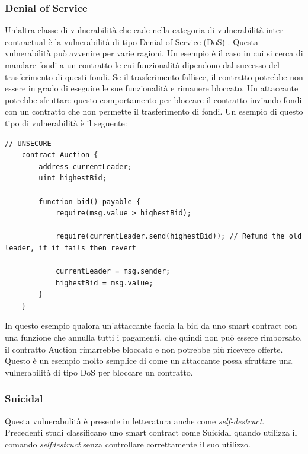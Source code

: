\documentclass[../../Thesis.tex]{subfiles}
\begin{document}
\subsubsection{Denial of Service}
Un'altra classe di vulnerabilità che cade nella categoria di vulnerabilità inter-contractual è la vulnerabilità di tipo Denial of Service (DoS) \cite{sc-vulnerabilities}. Questa vulnerabilità può avvenire per varie ragioni.
Un esempio è il caso in cui si cerca di mandare fondi a un contratto le cui funzionalità dipendono dal successo del trasferimento di questi fondi. Se il trasferimento fallisce, il contratto potrebbe non essere in grado di eseguire le sue funzionalità e rimanere bloccato. Un attaccante potrebbe sfruttare questo comportamento per bloccare il contratto inviando fondi con un contratto che non permette il trasferimento di fondi. Un esempio di questo tipo di vulnerabilità è il seguente:

\begin{lstlisting}[language=Solidity]
    // UNSECURE
    contract Auction {
        address currentLeader;
        uint highestBid;
    
        function bid() payable {
            require(msg.value > highestBid);
    
            require(currentLeader.send(highestBid)); // Refund the old leader, if it fails then revert
    
            currentLeader = msg.sender;
            highestBid = msg.value;
        }
    }
\end{lstlisting}
In questo esempio qualora un'attaccante faccia la bid da uno smart contract con una funzione che annulla tutti i pagamenti, che quindi non può essere rimborsato, il contratto Auction rimarrebbe bloccato e non potrebbe più ricevere offerte. Questo è un esempio molto semplice di come un attaccante possa sfruttare una vulnerabilità di tipo DoS per bloccare un contratto. 

\subsubsection{Suicidal}
Questa vulnerabulità è presente in letteratura anche come \emph{self-destruct}. Precedenti studi \cite{Suicidal} classificano uno smart contract come Suicidal quando utilizza il comando \emph{selfdestruct} senza controllare correttamente il suo utilizzo. 
\end{document}
